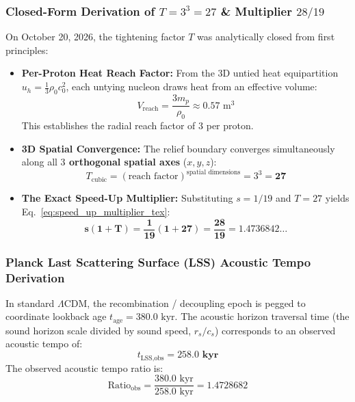 \documentclass[11pt,a4paper]{article}
\begin{document}
\subsubsection{Closed-Form Derivation of $T = 3^3 = 27$ \& Multiplier $28/19$}
\label{subsubsec:t27_derivation}

On October 20, 2026, the tightening factor $T$ was analytically closed from first principles:
\begin{itemize}
    \item \textbf{Per-Proton Heat Reach Factor:} From the 3D untied heat equipartition $u_h = \frac{1}{3}\rho_0 c_0^2$, each untying nucleon draws heat from an effective volume:
    \begin{equation}
    V_{\text{reach}} = \frac{3 m_p}{\rho_0} \approx 0.57\text{ m}^3
    \end{equation}
    This establishes the radial reach factor of \textbf{$3$} per proton.
    \item \textbf{3D Spatial Convergence:} The relief boundary converges simultaneously along all \textbf{$3$ orthogonal spatial axes} ($x, y, z$):
    \begin{equation}
    T_{\text{cubic}} = (\text{reach factor})^{\text{spatial dimensions}} = 3^3 = \mathbf{27}
    \end{equation}
    \item \textbf{The Exact Speed-Up Multiplier:} Substituting $s = 1/19$ and $T = 27$ yields Eq.~\eqref{eq:speed_up_multiplier_tex}:
    \begin{equation}
    \mathbf{s(1 + T) = \frac{1}{19}(1 + 27) = \frac{28}{19} = 1.4736842\dots}
    \label{eq:speed_up_multiplier_tex}
    \end{equation}
\end{itemize}

\subsubsection{Planck Last Scattering Surface (LSS) Acoustic Tempo Derivation}
\label{subsubsec:planck_lss_tempo}

In standard $\Lambda\text{CDM}$, the recombination / decoupling epoch is pegged to coordinate lookback age $t_{\text{age}} = 380.0\text{ kyr}$. The acoustic horizon traversal time (the sound horizon scale divided by sound speed, $r_s / c_s$) corresponds to an observed acoustic tempo of:
\begin{equation}
t_{\text{LSS,obs}} = \mathbf{258.0\text{ kyr}}
\end{equation}
The observed acoustic tempo ratio is:
\begin{equation}
\text{Ratio}_{\text{obs}} = \frac{380.0\text{ kyr}}{258.0\text{ kyr}} = \mathbf{1.4728682}
\end{equation}
\end{document}
